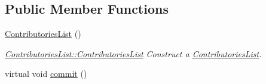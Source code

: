 \subsection*{Public Member Functions}
\begin{DoxyCompactItemize}
\item 
\hypertarget{classModels_1_1ContributoriesList_a3563e04b5d5b144846679f3ef4fd9387}{\hyperlink{classModels_1_1ContributoriesList_a3563e04b5d5b144846679f3ef4fd9387}{Contributories\-List} ()}\label{classModels_1_1ContributoriesList_a3563e04b5d5b144846679f3ef4fd9387}

\begin{DoxyCompactList}\small\item\em \hyperlink{classModels_1_1ContributoriesList_a3563e04b5d5b144846679f3ef4fd9387}{Contributories\-List\-::\-Contributories\-List} Construct a \hyperlink{classModels_1_1ContributoriesList}{Contributories\-List}. \end{DoxyCompactList}\item 
\hypertarget{classModels_1_1ContributoriesList_ad341e0527f4c9057281400f6cf54e54f}{virtual void \hyperlink{classModels_1_1ContributoriesList_ad341e0527f4c9057281400f6cf54e54f}{commit} ()}\label{classModels_1_1ContributoriesList_ad341e0527f4c9057281400f6cf54e54f}


\end{DoxyCompactItemize}
